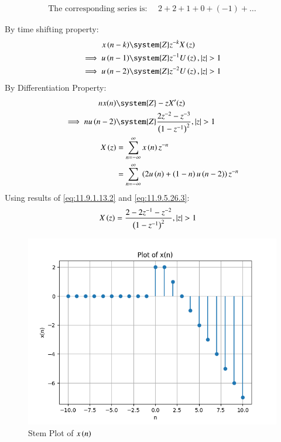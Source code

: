 \documentclass[journal,12pt,twocolumn]{IEEEtran}
\theoremstyle{remark}
\begin{document}
\begin{align*}
    \text{The corresponding series is: } \quad 2 + 2 + 1 + 0 + (-1) + \dots
\end{align*}

By time shifting property:
\begin{align}
	x\brak{n-k}&\system{Z} z^{-k}X\brak{z}\\
\label{eq:shiftk}
\implies u\brak{n-1} &\system{Z} z^{-1}U\brak{z} ,   \abs{z} >1\\
\implies u\brak{n-2} &\system{Z} z^{-2}U\brak{z} ,   \abs{z} >1\label{eq:11.9.1.13.2}
\end{align}
By Differentiation Property:
\begin{align}
	nx(n) &\system{Z} -zX^{\prime}(z)
\label{eq:xzder}\\
\implies    n u\brak{n-2} & \system{Z} \frac{2z^{-2}-z^{-3}}{\brak{1-z^{-1}}^2} ,   \abs{z} >1 \label{eq:11.9.5.26.3}\\
X\brak{z} &= \sum_{n=-\infty}^\infty x\brak{n} z^{-n}\\
            &=  \sum_{n=-\infty}^\infty \brak{2u\brak{n} + \brak{1-n}u\brak{n-2}} z^{-n}
\end{align}
Using results of \eqref{eq:11.9.1.13.2} and \eqref{eq:11.9.5.26.3}:
\begin{align}
    X\left(z\right) &= \frac{2-2z^{-1}-z^{-2}}{\left(1-z^{-1}\right)^2}  ,   \left\vert z\right\vert >1
\end{align}
\begin{figure}[htbp]
    \centering
    \includegraphics[width=1\columnwidth]{figs/fig_x(n).png}
    \caption{Stem Plot of $x\left(n\right)$}
    \label{fig:x(n)}
\end{figure}
\end{document}
